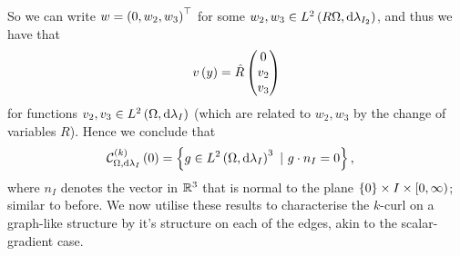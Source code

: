 So we can write $w=\left( 0, w_2, w_3 \right)^\top$ for some $w_2,w_3\in L^{2}\left( R\Omega,\mathrm{d}\lambda_{I_2} \right)$, and thus we have that
\begin{align*}
	v\left( y \right) = \hat{R}\begin{pmatrix} 0 \\ v_2 \\ v_3	\end{pmatrix}
\end{align*}
for functions $v_2,v_3\in L^{2}\left( \Omega,\mathrm{d}\lambda_I \right)$ (which are related to $w_2, w_3$ by the change of variables $R$).
Hence we conclude that
\begin{align} \label{eq:OneArbitrarySegmentCurl0Form}
	\mathcal{C}_{ \Omega, \mathrm{d}\lambda_I}^{(k)}\left( 0 \right) &= \left\{ g\in L^{2}\left( \Omega,\mathrm{d}\lambda_I \right)^3 \ \vert \ g\cdot n_I = 0 \right\},
\end{align}
where $n_I$ denotes the vector in $\mathbb{R}^3$ that is normal to the plane $\left\{ 0 \right\}\times I\times[0, \infty)$; similar to before.
We now utilise these results to characterise the $k$-curl on a graph-like structure by it's structure on each of the edges, akin to the scalar-gradient case.

